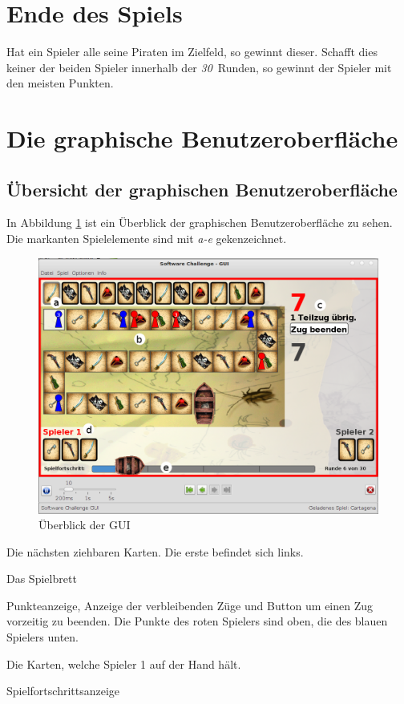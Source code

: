 \documentclass[a4paper, ngerman]{scrartcl}
\newcommand{\RundenAnzahl}{\emph{30}}
\begin{document}
\section{Ende des Spiels}
	Hat ein Spieler alle seine Piraten im Zielfeld, so gewinnt dieser. Schafft dies
	keiner der beiden Spieler innerhalb der \RundenAnzahl\ Runden, so
	gewinnt der Spieler mit den meisten Punkten.
	
\section{Die graphische Benutzeroberfläche}
\subsection{Übersicht der graphischen Benutzeroberfläche}
	In Abbildung \ref{fig:GUI} ist ein Überblick der graphischen Benutzeroberfläche
	zu sehen. Die markanten Spielelemente sind mit \emph{a-e} gekenzeichnet.
	 \begin{figure}[h!]
		\centering
		\label{fig:GUI}
		\includegraphics[width=\linewidth]{bilder/gui}
		\caption{Überblick der GUI}
	\end{figure}
	
	\begin{compactenum}[a)]
		\item Die nächsten ziehbaren Karten. Die erste befindet sich links.
		\item Das Spielbrett
		\item Punkteanzeige, Anzeige der verbleibenden Züge und Button um einen Zug
		vorzeitig zu beenden. Die Punkte des roten Spielers sind oben, die des blauen
		Spielers unten.
		\item Die Karten, welche Spieler 1 auf der Hand hält.
		\item Spielfortschrittsanzeige
	\end{compactenum}
	
\end{document}
